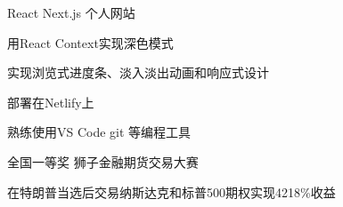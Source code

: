

\begin{cventries}

  \cventry
    {React Next.js} %
    {个人网站} %
    {} %
    {} %
    {
      \begin{cvitems} %
        \item {用React Context实现深色模式}
        \item {实现浏览式进度条、淡入淡出动画和响应式设计}
        \item {部署在Netlify上}
        \item {熟练使用VS Code git 等编程工具}
      \end{cvitems}
    }


\cventry
{全国一等奖} %
{狮子金融期货交易大赛} %
{} %
{} %
{
  \begin{cvitems} %
    \item {在特朗普当选后交易纳斯达克和标普500期权实现4218\%收益}
  \end{cvitems}
  }
\end{cventries}



  
